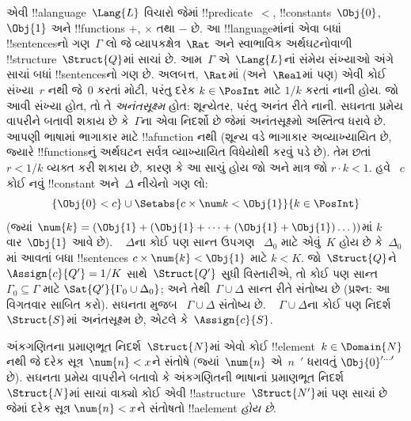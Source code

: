 \documentclass[../../../include/open-logic-section]{subfiles}
\begin{document}
{\begin{ex}
એવી !!a{language}~$\Lang{L}$ વિચારો જેમાં !!{predicate}~$<$,
!!{constant}s~$\Obj{0}$, $\Obj{1}$ અને !!{function}s $+$, $\times$ તથા
$-$ છે. આ !!{language}માંનાં એવા બધાં !!{sentence}sનો ગણ~$\Gamma$ લો
જે વ્યાપકક્ષેત્ર~$\Rat$ અને સ્વાભાવિક અર્થઘટનોવાળી
!!{structure}~$\Struct{Q}$માં સાચાં છે. આમ~$\Gamma$ એ~$\Lang{L}$નાં
સંમેય સંખ્યાઓ અંગે સાચાં બધાં !!{sentence}sનો ગણ છે. અલબત્ત,~$\Rat$માં
(અને~$\Real$માં પણ) એવી કોઈ સંખ્યા~$r$ નથી જે~$0$ કરતાં મોટી, પરંતુ
દરેક $k\in\PosInt$ માટે $1/k$ કરતાં નાની હોય. જો આવી સંખ્યા હોત, તો તે
\emph{અનંતસૂક્ષ્મ} હોત: શૂન્યેતર, પરંતુ અનંત રીતે નાની. સઘનતા પ્રમેય
વાપરીને બતાવી શકાય છે કે~$\Gamma$ના એવા નિદર્શો છે જેમાં અનંતસૂક્ષ્મો
અસ્તિત્વ ધરાવે છે. આપણી ભાષામાં ભાગાકાર માટે !!a{function} નથી
(શૂન્ય વડે ભાગાકાર અવ્યાખ્યાયિત છે, જ્યારે !!{function}sનું અર્થઘટન
સર્વત્ર વ્યાખ્યાયિત વિધેયોથી કરવું પડે છે). તેમ છતાં $r<1/k$ વ્યક્ત
કરી શકાય છે, કારણ કે આ સાચું હોય જો અને માત્ર જો $r\cdot k<1$. હવે
~$c$ કોઈ નવું !!{constant} અને~$\Delta$ નીચેનો ગણ લો:
\[
\{\Obj{0}<c\}
\cup \Setabs{c\times\num k<\Obj{1}}{k\in\PosInt}
\]
(જ્યાં $\num{k}=(\Obj{1}+(\Obj{1}+\dots+(\Obj{1}+\Obj{1})\dots))$માં
$k$ વાર~$\Obj{1}$ આવે છે). ~ $\Delta$ના કોઈ પણ સાન્ત ઉપગણ
~$\Delta_0$ માટે એવું~$K$ હોય છે કે~$\Delta_0$માં આવતાં બધા
!!{sentence}s $c\times\num{k}<\Obj{1}$ માટે $k<K$. જો~$\Struct{Q}$ને
$\Assign{c}{Q'}=1/K$ સાથે~$\Struct{Q'}$ સુધી વિસ્તારીએ, તો કોઈ પણ
સાન્ત $\Gamma_0\subseteq\Gamma$ માટે
$\Sat{Q'}{\Gamma_0\cup\Delta_0}$; અને તેથી~$\Gamma\cup\Delta$ સાન્ત
રીતે સંતોષ્ય છે (પ્રશ્ન: આ વિગતવાર સાબિત કરો). સઘનતા મુજબ
~$\Gamma\cup\Delta$ સંતોષ્ય છે. ~ $\Gamma\cup\Delta$ના કોઈ પણ નિદર્શ
~$\Struct{S}$માં અનંતસૂક્ષ્મ છે, એટલે કે~$\Assign{c}{S}$.
\end{ex}
}{}


\begin{prob}
અંકગણિતના પ્રમાણભૂત નિદર્શ~$\Struct{N}$માં એવો કોઈ
!!{element}~$k\in\Domain{N}$ નથી જે દરેક સૂત્ર~$\num{n}<x$ને સંતોષે
(જ્યાં~$\num{n}$ એ~$n$~$\prime$ ધરાવતું
$\Obj{0}^{\prime\dots\prime}$ છે). સઘનતા પ્રમેય વાપરીને બતાવો કે
અંકગણિતની ભાષાનાં પ્રમાણભૂત નિદર્શ~$\Struct{N}$માં સાચાં વાક્યો કોઈ
એવી !!a{structure}~$\Struct{N'}$માં પણ સાચાં છે જેમાં દરેક સૂત્ર
$\num{n}<x$ને સંતોષતો !!a{element} \emph{હોય છે}.
\end{prob}
\tagendprob
\end{document}
